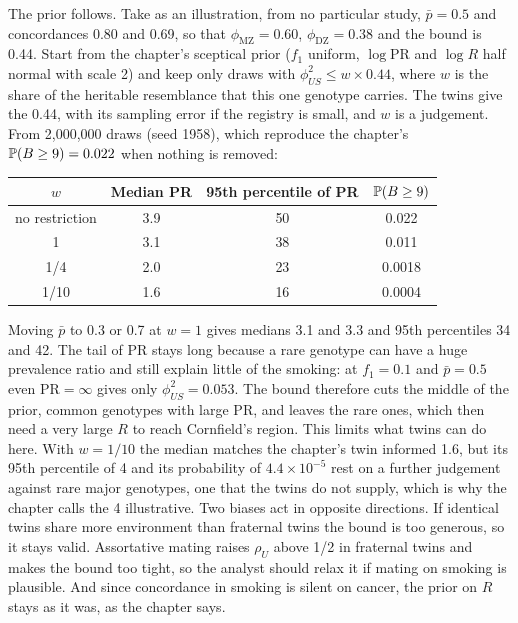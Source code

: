 The prior follows. Take as an illustration, from no particular study, $\bar p = 0.5$ and concordances 0.80 and 0.69, so that $\phi_{\mathrm{MZ}} = 0.60$, $\phi_{\mathrm{DZ}} = 0.38$ and the bound is 0.44. Start from the chapter's sceptical prior ($f_1$ uniform, $\log\mathrm{PR}$ and $\log R$ half normal with scale 2) and keep only draws with $\phi_{US}^2 \leq w \times 0.44$, where $w$ is the share of the heritable resemblance that this one genotype carries. The twins give the 0.44, with its sampling error if the registry is small, and $w$ is a judgement. From 2,000,000 draws (seed 1958), which reproduce the chapter's $\mathbb{P}(B \geq 9) = 0.022$ when nothing is removed:
\begin{center}
\begin{tabular}{cccc}
\toprule
$w$ & Median PR & 95th percentile of PR & $\mathbb{P}(B \geq 9)$ \\
\midrule
no restriction & 3.9 & 50 & 0.022 \\
1 & 3.1 & 38 & 0.011 \\
1/4 & 2.0 & 23 & 0.0018 \\
1/10 & 1.6 & 16 & 0.0004 \\
\bottomrule
\end{tabular}
\end{center}
Moving $\bar p$ to 0.3 or 0.7 at $w = 1$ gives medians 3.1 and 3.3 and 95th percentiles 34 and 42. The tail of PR stays long because a rare genotype can have a huge prevalence ratio and still explain little of the smoking: at $f_1 = 0.1$ and $\bar p = 0.5$ even $\mathrm{PR} = \infty$ gives only $\phi_{US}^2 = 0.053$. The bound therefore cuts the middle of the prior, common genotypes with large PR, and leaves the rare ones, which then need a very large $R$ to reach Cornfield's region. This limits what twins can do here. With $w = 1/10$ the median matches the chapter's twin informed 1.6, but its 95th percentile of 4 and its probability of $4.4 \times 10^{-5}$ rest on a further judgement against rare major genotypes, one that the twins do not supply, which is why the chapter calls the 4 illustrative. Two biases act in opposite directions. If identical twins share more environment than fraternal twins the bound is too generous, so it stays valid. Assortative mating raises $\rho_U$ above 1/2 in fraternal twins and makes the bound too tight, so the analyst should relax it if mating on smoking is plausible. And since concordance in smoking is silent on cancer, the prior on $R$ stays as it was, as the chapter says.

